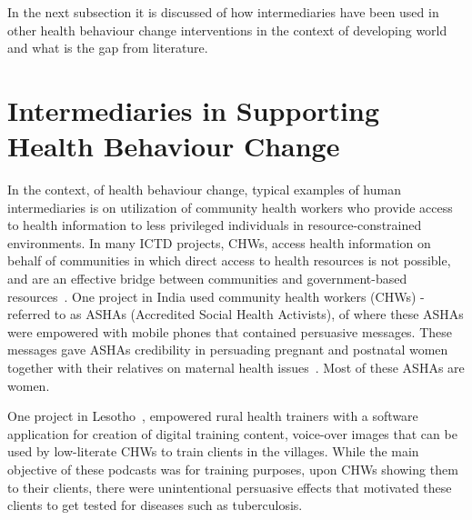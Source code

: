 In the next subsection it is discussed of how intermediaries have been used in other health behaviour change interventions in the context of developing world and what is the gap from literature.

\section{Intermediaries in Supporting Health Behaviour Change}
In the context, of health behaviour change, typical examples of human intermediaries is on utilization of community health workers who provide access to health information to less privileged individuals in resource-constrained environments.  In many ICTD projects, CHWs, access health information on behalf of communities in which direct access to health resources is not possible, and are an effective bridge between communities and government-based resources~\citep{katule2016leveraging}. One project in India used community health workers (CHWs) -referred to as  ASHAs (Accredited Social Health Activists), of where these ASHAs were empowered with mobile phones that contained persuasive messages. These messages gave ASHAs credibility in persuading pregnant and postnatal women together with their relatives on maternal health issues~\citep{ramachandran2010mobile,ramachandran2010research}. Most of these ASHAs are women.

One project in Lesotho~\citep{molapo2013software}, empowered rural health trainers with a software application for creation of digital  training  content, voice-over images  that can be used by low-literate CHWs to train clients in the villages. While the main objective of these podcasts was for training purposes, upon CHWs showing them to their clients, there were unintentional persuasive effects that motivated these clients to get tested for diseases such as tuberculosis.

